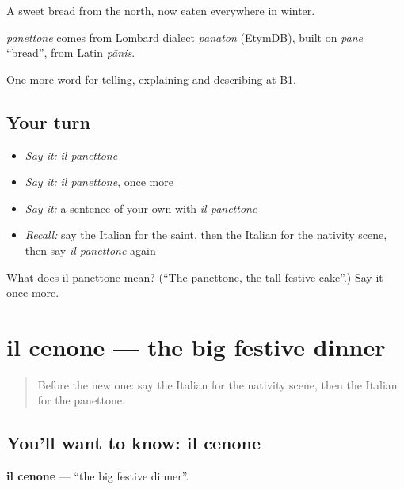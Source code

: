 A sweet bread from the north, now eaten everywhere in winter.

\begin{cousinweb}
\emph{panettone} comes from Lombard dialect \emph{panaton} (EtymDB), built on \emph{pane} \textquotedblleft{}bread\textquotedblright{}, from Latin \emph{pānis}.
\end{cousinweb}

\begin{grammarlens}[title={What you've built}]
One more word for telling, explaining and describing at B1.
\end{grammarlens}

\subsection*{Your turn}
\begin{itemize}
\raggedright
  \item \emph{Say it:} \emph{il panettone}
  \item \emph{Say it:} \emph{il panettone}, once more
  \item \emph{Say it:} a sentence of your own with \emph{il panettone}
  \item \emph{Recall:} say the Italian for the saint, then the Italian for the nativity scene, then say \emph{il panettone} again
\end{itemize}

\begin{tcolorbox}[breakable,colback=teal!4,colframe=teal!35!black,title={Before you move on}]
What does il panettone mean? (\textquotedblleft{}The panettone, the tall festive cake\textquotedblright{}.) Say it once more.
\end{tcolorbox}
\section[il cenone]{il cenone — the big festive dinner}

\label{lesson:IT-C321-cenone}



\begin{quote}
Before the new one: say the Italian for the nativity scene, then the Italian for the panettone.
\end{quote}

\subsection*{You'll want to know: il cenone}
\textbf{il cenone} — \textquotedblleft{}the big festive dinner\textquotedblright{}.

